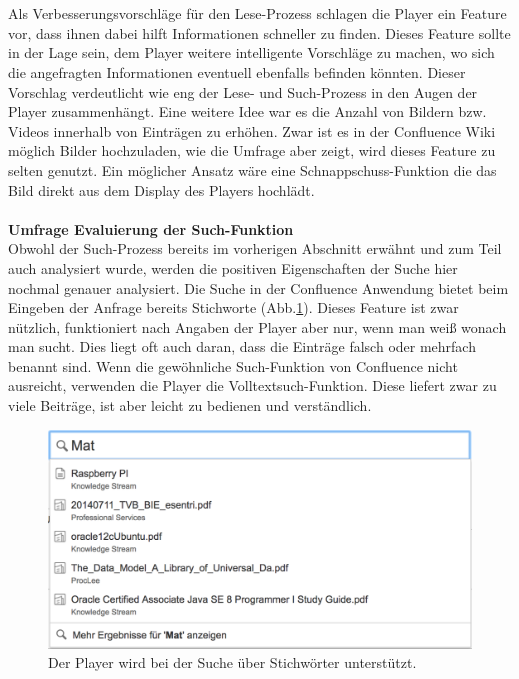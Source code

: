 \documentclass[a4paper,12pt,twoside]{scrartcl}
\begin{document}
\\\\
Als Verbesserungsvorschläge für den Lese-Prozess schlagen die Player ein Feature vor, dass ihnen dabei hilft Informationen schneller zu finden. Dieses Feature sollte in der Lage sein, dem Player weitere intelligente Vorschläge zu machen, wo sich die angefragten Informationen eventuell ebenfalls befinden könnten. Dieser Vorschlag verdeutlicht wie eng der Lese- und Such-Prozess in den Augen der Player zusammenhängt. Eine weitere Idee war es die Anzahl von Bildern bzw. Videos innerhalb von Einträgen zu erhöhen. Zwar ist es in der Confluence Wiki möglich Bilder hochzuladen, wie die Umfrage aber zeigt, wird dieses Feature zu selten genutzt. Ein möglicher Ansatz wäre eine Schnappschuss-Funktion die das Bild direkt aus dem Display des Players hochlädt.
\\\\
\textbf{Umfrage Evaluierung der Such-Funktion}\\
Obwohl der Such-Prozess bereits im vorherigen Abschnitt erwähnt und zum Teil auch analysiert wurde, werden die positiven Eigenschaften der Suche hier nochmal genauer analysiert. Die Suche in der Confluence Anwendung bietet beim Eingeben der Anfrage bereits Stichworte (Abb.\ref{Sucheingabe}). Dieses Feature ist zwar nützlich, funktioniert nach Angaben der Player aber nur, wenn man weiß wonach man sucht. Dies liegt oft auch daran, dass die Einträge falsch oder mehrfach benannt sind. Wenn die gewöhnliche Such-Funktion von Confluence nicht ausreicht, verwenden die Player die Volltextsuch-Funktion. Diese liefert zwar zu viele Beiträge, ist aber leicht zu bedienen und verständlich.
\\
\begin{figure}[h!]
\begin{center}
\includegraphics[scale = 0.4]{Bilder/Sucheingabe.eps}
\caption{Der Player wird bei der Suche über Stichwörter unterstützt.}
\label{Sucheingabe}
\end{center}
\end{figure}
\end{document}
